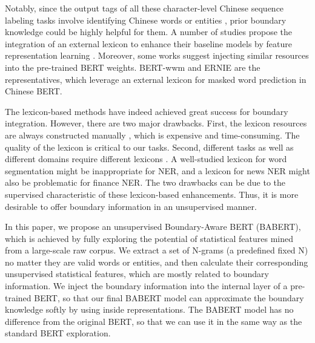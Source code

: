 \documentclass[11pt]{article}
\begin{document}
\begin{CJK}{UTF8}{gbsn}
Notably, since the output tags of all these character-level Chinese sequence labeling tasks involve 
identifying Chinese words or entities \cite{zhang-yang-2018-chinese, yang-etal-2019-subword},
prior boundary knowledge could be highly helpful for them.
A number of studies propose the integration of an external lexicon to enhance their baseline models
by feature representation learning \cite{jia-etal-2020-entity, tian-etal-2020-joint-chinese, liu-etal-2021-lexicon}.
Moreover, some works suggest injecting similar resources into the pre-trained BERT weights.
BERT-wwm \cite{cui2021pre} and ERNIE \cite{sun2019ernie} are the representatives,
which leverage an external lexicon for masked word prediction in Chinese BERT.







The lexicon-based methods have indeed achieved great success for boundary integration.
However, there are two major drawbacks.
First, the lexicon resources are always constructed manually \cite{zhang-yang-2018-chinese, diao-etal-2020-zen, jia-etal-2020-entity, liu-etal-2021-lexicon}, which is expensive and time-consuming.
The quality of the lexicon is critical to our tasks.
Second, different tasks as well as different domains require different lexicons \cite{jia-etal-2020-entity, liu-etal-2021-lexicon}.
A well-studied lexicon for word segmentation might be inappropriate for NER,
and a lexicon for news NER might also be problematic for finance NER.
The two drawbacks can be due to the supervised characteristic of these lexicon-based enhancements.
Thus, it is more desirable to offer boundary information in an unsupervised manner.





In this paper, we propose an unsupervised Boundary-Aware BERT (BABERT),
which is achieved by fully exploring the potential of statistical features mined from a large-scale raw corpus.
We extract a set of N-grams (a predefined fixed N) no matter they are valid words or entities,
and then calculate their corresponding unsupervised statistical features, which are mostly related to boundary information.
We inject the boundary information into the internal layer of a pre-trained BERT,
so that our final BABERT model can approximate the boundary knowledge softly by using inside representations.
The BABERT model has no difference from the original BERT,
so that we can use it in the same way as the standard BERT exploration.





\end{CJK}
\end{document}
